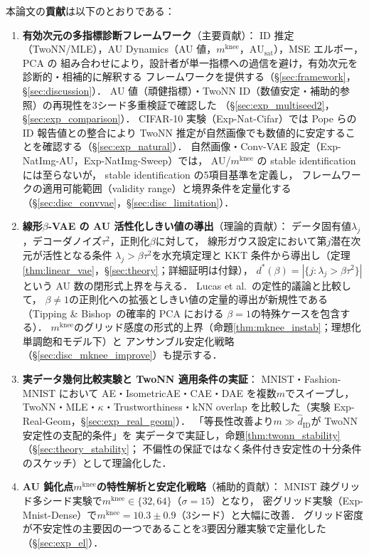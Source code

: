 \documentclass[11pt,a4paper]{jsarticle}
\newcommand{\kap}{\kappa}
\newcommand{\AUsat}{\mathrm{AU}_{\mathrm{sat}}}
\newcommand{\mknee}{m^{\mathrm{knee}}}
\begin{document}
本論文の\textbf{貢献}は以下のとおりである：
\begin{enumerate}
  \item \textbf{有効次元の多指標診断フレームワーク}（主要貢献）：
        ID 推定（TwoNN/MLE），AU Dynamics（AU 値，$\mknee$，$\AUsat$），MSE エルボー，PCA の
        組み合わせにより，設計者が単一指標への過信を避け，有効次元を診断的・相補的に解釈する
        フレームワークを提供する（§\ref{sec:framework}，§\ref{sec:discussion}）．
        AU 値（頑健指標）・TwoNN ID（数値安定・補助的参照）の再現性を3シード多重検証で確認した
        （§\ref{sec:exp_multiseed2}，§\ref{sec:exp_comparison}）．
        CIFAR-10 実験（Exp-Nat-Cifar）では Pope ら\cite{pope2021intrinsic}の ID 報告値との整合により
        TwoNN 推定が自然画像でも数値的に安定することを確認する（§\ref{sec:exp_natural}）．
        自然画像・Conv-VAE 設定（Exp-NatImg-AU，Exp-NatImg-Sweep）では，
        AU/$\mknee$ の stable identification には至らないが，
        stable identification の5項目基準を定義し，
        フレームワークの適用可能範囲（validity range）と境界条件を定量化する
        （§\ref{sec:disc_convvae}，§\ref{sec:disc_limitation}）．
  \item \textbf{線形$\beta$-VAE の AU 活性化しきい値の導出}（理論的貢献）：
        データ固有値$\lambda_j$，デコーダノイズ$\tau^2$，正則化$\beta$に対して，
        線形ガウス設定において第$j$潜在次元が活性となる条件
        $\lambda_j > \beta\tau^2$を水充填定理と KKT 条件から導出し（定理\ref{thm:linear_vae}，§\ref{sec:theory}；詳細証明は付録），
        $d^*(\beta) = |\{j:\lambda_j > \beta\tau^2\}|$という AU 数の閉形式上界を与える．
        Lucas et al.~\cite{lucas2019elbo}の定性的議論と比較して，
        $\beta \neq 1$の正則化への拡張としきい値の定量的導出が新規性である
        （Tipping \& Bishop~\cite{tippingbishop1999ppca}の確率的 PCA における
        $\beta=1$の特殊ケースを包含する）．
        $\mknee$のグリッド感度の形式的上界（命題\ref{thm:mknee_instab}；理想化単調飽和モデル下）と
        アンサンブル安定化戦略（§\ref{sec:disc_mknee_improve}）も提示する．
  \item \textbf{実データ幾何比較実験と TwoNN 適用条件の実証}：
        MNIST・Fashion-MNIST において AE・IsometricAE・CAE・DAE を複数$m$でスイープし，
        TwoNN・MLE・$\kap$・Trustworthiness・kNN overlap を比較した（実験 Exp-Real-Geom，§\ref{sec:exp_real_geom}）．
        「等長性改善より$m \gg \hat{d}_\mathrm{ID}$が TwoNN 安定性の支配的条件」を
        実データで実証し，命題\ref{thm:twonn_stability}（§\ref{sec:theory_stability}；
        不偏性の保証ではなく条件付き安定性の十分条件のスケッチ）として理論化した．
  \item \textbf{AU 鈍化点$\mknee$の特性解析と安定化戦略}（補助的貢献）：
        MNIST 疎グリッド多シード実験で$\mknee \in \{32,64\}$（$\sigma=15$）となり，
        密グリッド実験（Exp-Mnist-Dense）で$\mknee = 10.3 \pm 0.9$（3シード）と大幅に改善．
        グリッド密度が不安定性の主要因の一つであることを3要因分離実験で定量化した（§\ref{sec:exp_el}）．
\end{enumerate}
\end{document}
